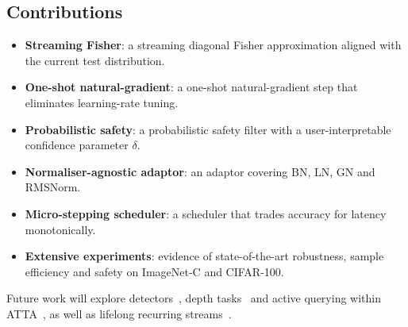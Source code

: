 \documentclass{article} %
\begin{document}
\subsection{Contributions}
\begin{itemize}
  \item \textbf{Streaming Fisher}: a streaming diagonal Fisher approximation aligned with the current test distribution.
  \item \textbf{One-shot natural-gradient}: a one-shot natural-gradient step that eliminates learning-rate tuning.
  \item \textbf{Probabilistic safety}: a probabilistic safety filter with a user-interpretable confidence parameter \(\delta\).
  \item \textbf{Normaliser-agnostic adaptor}: an adaptor covering BN, LN, GN and RMSNorm.
  \item \textbf{Micro-stepping scheduler}: a scheduler that trades accuracy for latency monotonically.
  \item \textbf{Extensive experiments}: evidence of state-of-the-art robustness, sample efficiency and safety on ImageNet-C and CIFAR-100.
\end{itemize}
Future work will explore detectors~\cite{yoo-2023-what}, depth tasks~\cite{park-2024-test} and active querying within ATTA~\cite{gui-2024-active}, as well as lifelong recurring streams~\cite{hoang-2023-persistent}.
\end{document}
